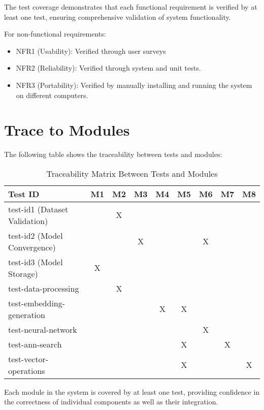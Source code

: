 \documentclass[12pt, titlepage]{article}
\begin{document}
The test coverage demonstrates that each functional requirement is verified by at least one test, ensuring comprehensive validation of system functionality.

For non-functional requirements:
\begin{itemize}
    \item NFR1 (Usability): Verified through user surveys
    \item NFR2 (Reliability): Verified through system and unit tests.
    \item NFR3 (Portability): Verified by manually installing and running the system on different computers.
\end{itemize}

\section{Trace to Modules}		

The following table shows the traceability between tests and modules:

\begin{table}[h!]
\centering
\begin{tabular}{|l|c|c|c|c|c|c|c|c|}
\hline
\textbf{Test ID} & \textbf{M1} & \textbf{M2} & \textbf{M3} & \textbf{M4} & \textbf{M5} & \textbf{M6} & \textbf{M7} & \textbf{M8} \\
\hline
test-id1 (Dataset Validation) &  & X &  &  &  &  &  &  \\
\hline
test-id2 (Model Convergence) &  &  & X &  &  & X &  &  \\
\hline
test-id3 (Model Storage) & X &  &  &  &  &  &  &  \\
\hline
test-data-processing &  & X &  &  &  &  &  &  \\
\hline
test-embedding-generation &  &  &  & X & X &  &  &  \\
\hline
test-neural-network &  &  &  &  &  & X &  &  \\
\hline
test-ann-search &  &  &  &  & X &  & X &  \\
\hline
test-vector-operations &  &  &  &  & X &  &  & X \\
\hline
\end{tabular}
\caption{Traceability Matrix Between Tests and Modules}
\label{Table:module_trace}
\end{table}

Each module in the system is covered by at least one test, providing confidence in the correctness of individual components as well as their integration.
\end{document}
